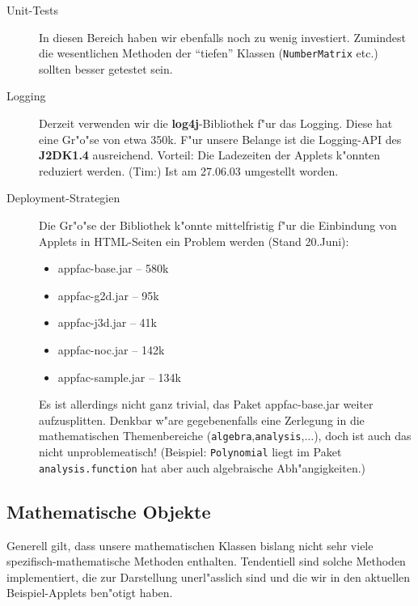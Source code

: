 \documentclass[a4paper,12pt]{article}
\newcommand{\code}[1]{\texttt{#1}}
\begin{document}
\begin{description}
\item [Unit-Tests]
In diesen Bereich haben wir ebenfalls noch zu wenig investiert. Zumindest
die wesentlichen Methoden der ``tiefen'' Klassen (\code{NumberMatrix} etc.)
sollten besser getestet sein.

\item [Logging]
Derzeit verwenden wir die \textbf{log4j}-Bibliothek f"ur das Logging. Diese
hat eine Gr"o"se von etwa 350k. F"ur unsere Belange ist die Logging-API des
\textbf{J2DK1.4} ausreichend. Vorteil: Die Ladezeiten der Applets k"onnten
reduziert werden. (Tim:) Ist am 27.06.03 umgestellt worden.

\item [Deployment-Strategien]
Die Gr"o"se der Bibliothek k"onnte mittelfristig f"ur die Einbindung von
Applets in HTML-Seiten ein Problem werden (Stand 20.Juni):
\begin{itemize}
\item appfac-base.jar  -- 580k
\item appfac-g2d.jar -- 95k
\item appfac-j3d.jar -- 41k
\item appfac-noc.jar -- 142k
\item appfac-sample.jar -- 134k
\end{itemize}
Es ist allerdings nicht ganz trivial, das Paket appfac-base.jar weiter
aufzusplitten. Denkbar w"are gegebenenfalls eine Zerlegung in die
mathematischen Themenbereiche (\code{algebra},\code{analysis},$\ldots$), doch
ist auch das nicht unproblemeatisch! (Beispiel: \code{Polynomial} liegt im
Paket \code{analysis.function} hat aber auch algebraische Abh"angigkeiten.)
\end{description}


\subsection{Mathematische Objekte}
Generell gilt, dass unsere mathematischen Klassen bislang nicht sehr
viele spezifisch-mathematische Methoden enthalten. Tendentiell sind solche
Methoden implementiert, die zur Darstellung unerl"asslich sind und die wir
in den aktuellen Beispiel-Applets ben"otigt haben.
\end{document}

